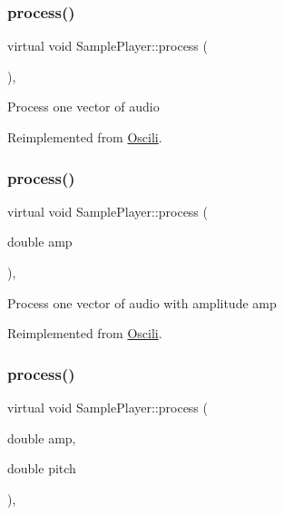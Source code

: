 \subsubsection{\texorpdfstring{process()}{process()}\hspace{0.1cm}{\footnotesize\ttfamily [1/3]}}
{\footnotesize\ttfamily virtual void Sample\+Player\+::process (\begin{DoxyParamCaption}{ }\end{DoxyParamCaption})\hspace{0.3cm}{\ttfamily [inline]}, {\ttfamily [virtual]}}

Process one vector of audio 

Reimplemented from \hyperlink{class_oscili_a2571464f3b4874c3ca691061e8db7d32}{Oscili}.

\mbox{\label{class_sample_player_a806595c5e7674717d52bb8a57f451c0b}} 
\subsubsection{\texorpdfstring{process()}{process()}\hspace{0.1cm}{\footnotesize\ttfamily [2/3]}}
{\footnotesize\ttfamily virtual void Sample\+Player\+::process (\begin{DoxyParamCaption}\item[{double}]{amp }\end{DoxyParamCaption})\hspace{0.3cm}{\ttfamily [inline]}, {\ttfamily [virtual]}}

Process one vector of audio with amplitude amp 

Reimplemented from \hyperlink{class_oscili_a1fb47dff09f771481e1a1d2fde39d775}{Oscili}.

\mbox{\label{class_sample_player_a01fc7c2fdfd29c0c178e288d5aa06acc}} 
\subsubsection{\texorpdfstring{process()}{process()}\hspace{0.1cm}{\footnotesize\ttfamily [3/3]}}
{\footnotesize\ttfamily virtual void Sample\+Player\+::process (\begin{DoxyParamCaption}\item[{double}]{amp,  }\item[{double}]{pitch }\end{DoxyParamCaption})\hspace{0.3cm}{\ttfamily [inline]}, {\ttfamily [virtual]}}

